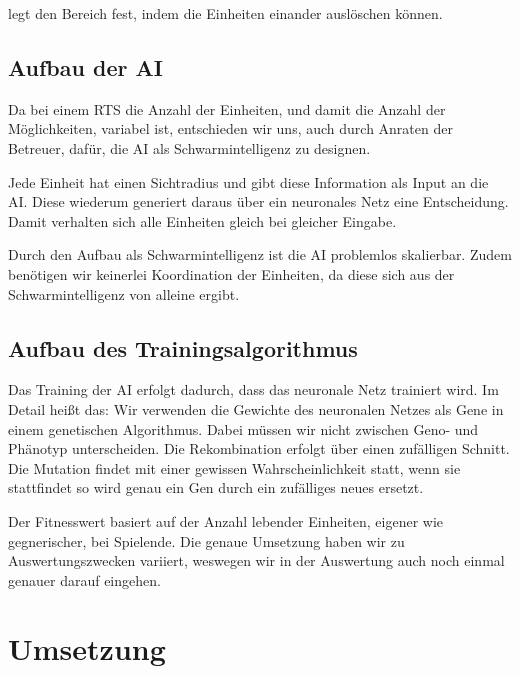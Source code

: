 \documentclass[
	12pt,
	a4paper,
	BCOR10mm,
	DIV14,
	headsepline,
	usegeometry,
]{scrreprt}
\begin{document}
 legt den Bereich fest, indem die Einheiten einander auslöschen können.


\section{Aufbau der AI}
Da bei einem RTS die Anzahl der Einheiten, und damit die Anzahl der Möglichkeiten, variabel ist, entschieden wir uns, auch durch Anraten der Betreuer, dafür, die AI als Schwarmintelligenz zu designen.

Jede Einheit hat einen Sichtradius und gibt diese Information als Input an die AI. 
Diese wiederum generiert daraus über ein neuronales Netz eine Entscheidung. 
Damit verhalten sich alle Einheiten gleich bei gleicher Eingabe. 

Durch den Aufbau als Schwarmintelligenz ist die AI problemlos skalierbar. 
Zudem benötigen wir keinerlei Koordination der Einheiten, da diese sich aus der Schwarmintelligenz von alleine ergibt.

\section{Aufbau des Trainingsalgorithmus}
Das Training der AI erfolgt dadurch, dass das neuronale Netz trainiert wird.
Im Detail heißt das: Wir verwenden die Gewichte des neuronalen Netzes als Gene in einem genetischen Algorithmus.
Dabei müssen wir nicht zwischen Geno- und Phänotyp unterscheiden.
Die Rekombination erfolgt über einen zufälligen Schnitt.
Die Mutation findet mit einer gewissen Wahrscheinlichkeit statt, wenn sie stattfindet so wird genau ein Gen durch ein zufälliges neues ersetzt.

Der Fitnesswert basiert auf der Anzahl lebender Einheiten, eigener wie gegnerischer, bei Spielende.
Die genaue Umsetzung haben wir zu Auswertungszwecken variiert, weswegen wir in der Auswertung auch noch einmal genauer darauf eingehen.

\chapter{Umsetzung}
\label{Umsetzung}
\end{document}
